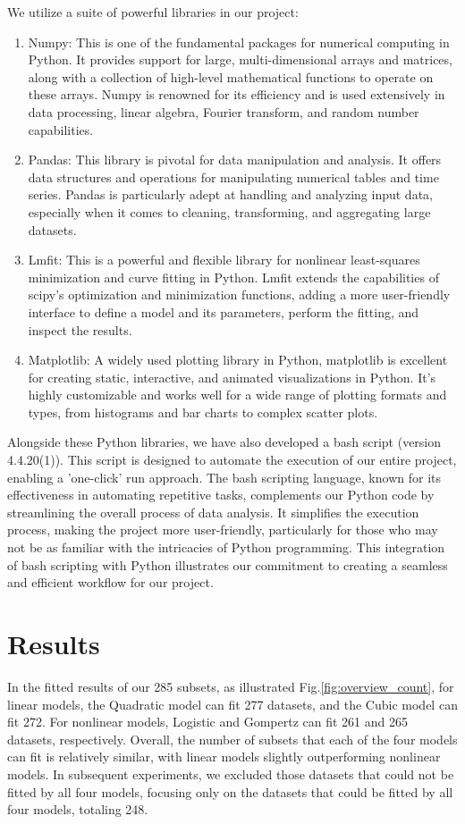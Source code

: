 \documentclass[11pt]{article}
\begin{document}
\begin{linenumbers}
We utilize a suite of powerful libraries in our project:
\begin{enumerate}
    \item Numpy: This is one of the fundamental packages for numerical computing in Python. It provides support for large, multi-dimensional arrays and matrices, along with a collection of high-level mathematical functions to operate on these arrays. Numpy is renowned for its efficiency and is used extensively in data processing, linear algebra, Fourier transform, and random number capabilities.
    \item Pandas: This library is pivotal for data manipulation and analysis. It offers data structures and operations for manipulating numerical tables and time series. Pandas is particularly adept at handling and analyzing input data, especially when it comes to cleaning, transforming, and aggregating large datasets.
    \item Lmfit: This is a powerful and flexible library for nonlinear least-squares minimization and curve fitting in Python. Lmfit extends the capabilities of scipy's optimization and minimization functions, adding a more user-friendly interface to define a model and its parameters, perform the fitting, and inspect the results.
    \item Matplotlib: A widely used plotting library in Python, matplotlib is excellent for creating static, interactive, and animated visualizations in Python. It's highly customizable and works well for a wide range of plotting formats and types, from histograms and bar charts to complex scatter plots.
\end{enumerate}


Alongside these Python libraries, we have also developed a bash script (version 4.4.20(1)). This script is designed to automate the execution of our entire project, enabling a 'one-click' run approach. The bash scripting language, known for its effectiveness in automating repetitive tasks, complements our Python code by streamlining the overall process of data analysis. It simplifies the execution process, making the project more user-friendly, particularly for those who may not be as familiar with the intricacies of Python programming. This integration of bash scripting with Python illustrates our commitment to creating a seamless and efficient workflow for our project.

            

    \section{Results}
        In the fitted results of our 285 subsets, as illustrated Fig.\ref{fig:overview_count}, for linear models, the Quadratic model can fit 277 datasets, and the Cubic model can fit 272. For nonlinear models, Logistic and Gompertz can fit 261 and 265 datasets, respectively. Overall, the number of subsets that each of the four models can fit is relatively similar, with linear models slightly outperforming nonlinear models. In subsequent experiments, we excluded those datasets that could not be fitted by all four models, focusing only on the datasets that could be fitted by all four models, totaling 248.


\end{linenumbers}
\end{document}
